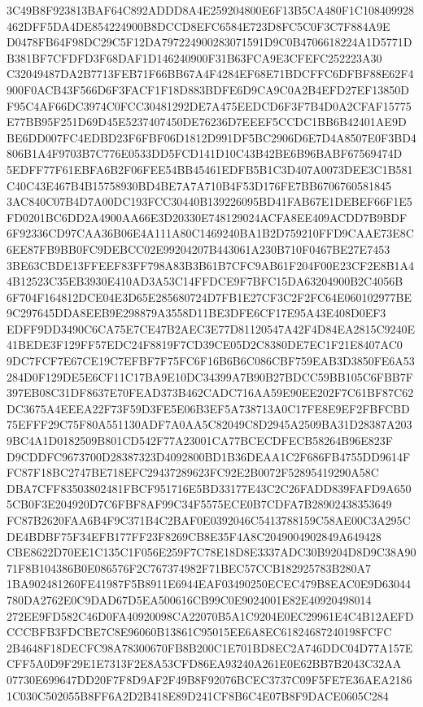 \documentclass[UTF8,fontset=fandol,zihao=-4,a4paper]{ctexart}
\begin{document}
{{3C49B8F923813BAF64C892ADDD8A4E259204800E6F13B5CA480F1C108409928462DFF5DA4DE854224900B8DCCD8EFC6584E723D8FC5C0F3C7F884A9E
D0478FB64F98DC29C5F12DA797224900283071591D9C0B4706618224A1D5771DB381BF7CFDFD3F68DAF1D146240900F31B63FCA9E3CFEFC252223A30
C32049487DA2B7713FEB71F66BB67A4F4284EF68E71BDCFFC6DFBF88E62F4900F0ACB43F566D6F3FACF1F18D883BDFE6D9CA9C0A2B4EFD27EF13850D
F95C4AF66DC3974C0FCC30481292DE7A475EEDCD6F3F7B4D0A2CFAF15775E77BB95F251D69D45E5237407450DE76236D7EEEF5CCDC1BB6B42401AE9D
BE6DD007FC4EDBD23F6FBF06D1812D991DF5BC2906D6E7D4A8507E0F3BD4806B1A4F9703B7C776E0533DD5FCD141D10C43B42BE6B96BABF67569474D
5EDFF77F61EBFA6B2F06FEE54BB45461EDFB5B1C3D407A0073DEE3C1B581C40C43E467B4B15758930BD4BE7A7A710B4F53D176FE7BB6706760581845
3AC840C07B4D7A00DC193FCC30440B139226095BD41FAB67E1DEBEF66F1E5FD0201BC6DD2A4900AA66E3D20330E748129024ACFA8EE409ACDD7B9BDF
6F92336CD97CAA36B06E4A111A80C1469240BA1B2D759210FFD9CAAE73E8C6EE87FB9BB0FC9DEBCC02E99204207B443061A230B710F0467BE27E7453
3BE63CBDE13FFEEF83FF798A83B3B61B7CFC9AB61F204F00E23CF2E8B1A44B12523C35EB3930E410AD3A53C14FFDCE9F7BFC15DA63204900B2C4056B
6F704F164812DCE04E3D65E285680724D7FB1E27CF3C2F2FC64E060102977BE9C297645DDA8EEB9E298879A3558D11BE3DFE6CF17E95A43E408D0EF3
EDFF9DD3490C6CA75E7CE47B2AEC3E77D81120547A42F4D84EA2815C9240E41BEDE3F129FF57EDC24F8819F7CD39CE05D2C8380DE7EC1F21E8407AC0
9DC7FCF7E67CE19C7EFBF7F75FC6F16B6B6C086CBF759EAB3D3850FE6A53284D0F129DE5E6CF11C17BA9E10DC34399A7B90B27BDCC59BB105C6FBB7F
397EB08C31DF8637E70FEAD373B462CADC716AA59E90EE202F7C61BF87C62DC3675A4EEEA22F73F59D3FE5E06B3EF5A738713A0C17FE8E9EF2FBFCBD
75EFFF29C75F80A551130ADF7A0AA5C82049C8D2945A2509BA31D28387A2039BC4A1D0182509B801CD542F77A23001CA77BCECDFECB58264B96E823F
D9CDDFC9673700D28387323D4092800BD1B36DEAA1C2F686FB4755DD9614FFC87F18BC2747BE718EFC29437289623FC92E2B0072F52895419290A58C
DBA7CFF83503802481FBCF951716E5BD33177E43C2C26FADD839FAFD9A6505CB0F3E204920D7C6FBF8AF99C34F5575ECE0B7CDFA7B28902438353649
FC87B2620FAA6B4F9C371B4C2BAF0E0392046C5413788159C58AE00C3A295CDE4BDBF75F34EFB177FF23F8269CB8E35F4A8C2049004902849A649428
CBE8622D70EE1C135C1F056E259F7C78E18D8E3337ADC30B9204D8D9C38A9071F8B104386B0E086576F2C767374982F71BEC57CCB182925783B280A7
1BA902481260FE41987F5B8911E6944EAF03490250ECEC479B8EAC0E9D63044780DA2762E0C9DAD67D5EA500616CB99C0E9024001E82E40920498014
272EE9FD582C46D0FA40920098CA22070B5A1C9204E0EC29961E4C4B12AEFDCCCBFB3FDCBE7C8E96060B13861C95015EE6A8EC61824687240198FCFC
2B4648F18DECFC98A78300670FB8B200C1E701BD8EC2A746DDC04D77A157ECFF5A0D9F29E1E7313F2E8A53CFD86EA93240A261E0E62BB7B2043C32AA
07730E699647DD20F7F8D9AF2F49B8F92076BCEC3737C09F5FE7E36AEA21861C030C502055B8FF6A2D2B418E89D241CF8B6C4E07B8F9DACE0605C284
}}
\end{document}
